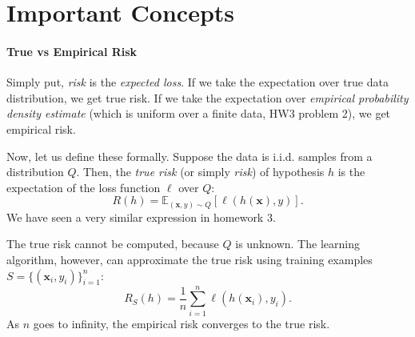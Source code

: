 \documentclass{discussion}
\begin{document}


   
\renewcommand{\R}{\mathbb{R}}
\renewcommand{\vec}[1]{\mathbf{#1}}
\newcommand{\Dtrain}{\mathcal{D}_{\mathrm{train}}}
\newcommand{\tm}{\mathbf{\theta}_{\text{model}}}
\newcommand{\xtest}{\mathbf{\x}_{\text{test}}}
\newcommand{\test}{\mathrm{test}}
\newcommand{\pred}{\mathrm{pred}}

\newcommand{\D}{\mathcal{D}}
\newcommand{\F}{F}
\newcommand{\WL}{\mathrm{WL}}
\section{Important Concepts}
\paragraph{True vs Empirical Risk} Simply put,  \emph{risk} is the \emph{expected loss}. If we take the expectation over true data distribution, we get true risk. If we take the expectation over \emph{empirical probability density estimate} (which is uniform over a finite data, HW3 problem 2), we get empirical risk.

Now, let us define these formally. Suppose the data is i.i.d. samples from a distribution $Q$. Then, the \emph{true risk} (or simply \emph{risk}) of hypothesis $h$ is the expectation of the loss function $\ell$ over $Q$:
\[R(h) = \mathbb{E}_{(\mathbf{x},y) \sim Q}[\ell(h(\mathbf{x}), y)].\]
We have seen a very similar expression in homework 3.

The true risk cannot be computed, because $Q$ is unknown. The learning algorithm, however, can approximate the true risk using training examples $S = \{(\vec{x}_i, y_i)\}_{i=1}^{n}$:
\[R_S(h) = \frac{1}{n} \sum_{i=1}^{n} \ell(h(\mathbf{x}_i), y_i).\]
As $n$ goes to infinity, the empirical risk converges to the true risk.
\end{document}
